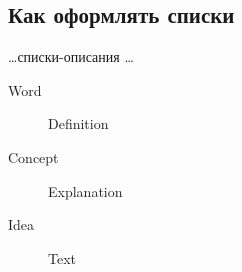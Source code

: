 \subsection{Как оформлять списки}

\dots списки-описания \dots

\begin{description}
  \item[Word] Definition
  \item[Concept] Explanation
  \item[Idea] Text
\end{description}

\Conc


\printbibliography[%
    heading=bibintoc%
]

\appendix
{}

\fi


